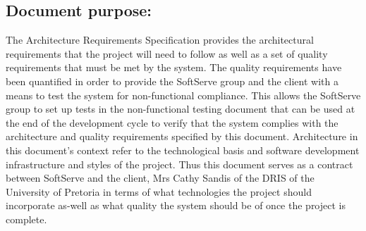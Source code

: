 \documentclass[12pt]{article}
\begin{document}
\subsection{Document purpose:}
\vspace{0.2in}
The Architecture Requirements Specification provides the architectural requirements that the project will need to follow as well as a set of quality requirements that must be met by the system. The quality requirements have been quantified in order to provide the SoftServe group and the client with a means to test the system for non-functional compliance. This allows the SoftServe group to set up tests in the non-functional testing document that can be used at the end of the development cycle to verify that the system complies with the architecture and quality requirements specified by this document. Architecture in this document's context refer to the technological basis and software development infrastructure and styles of the project. Thus this document serves as a contract between SoftServe and the client, Mrs Cathy Sandis of the DRIS of the University of Pretoria in terms of what technologies the project should incorporate as-well as what quality the system should be of once the project is complete.

\vspace{0.2in}
\end{document}
